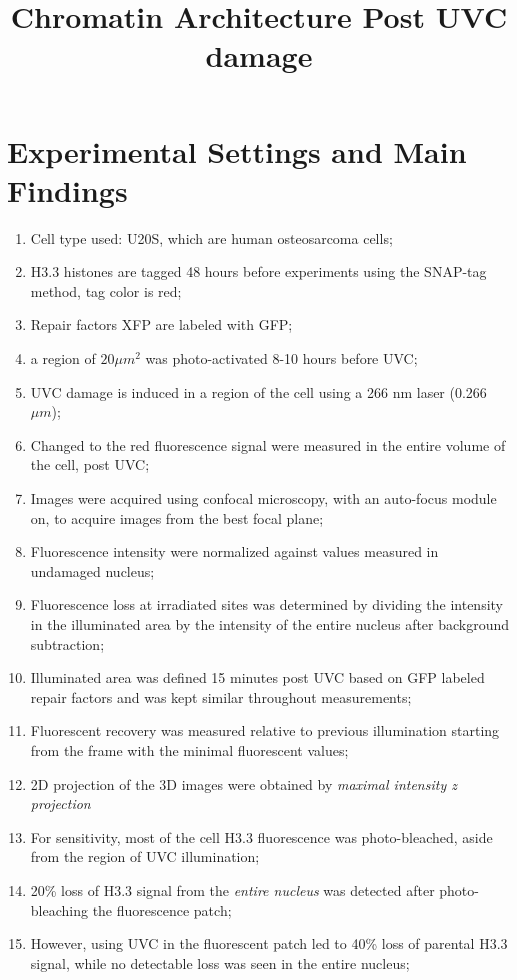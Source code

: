 \documentclass[12pt]{report}
\begin{document}
	
	\title{Chromatin Architecture Post UVC damage}
	\maketitle
	\section{Experimental Settings and Main Findings}
	\begin{enumerate}
		\item Cell type used: U20S, which are human osteosarcoma cells;
		\item H3.3 histones are tagged 48 hours before experiments using the SNAP-tag method, tag color is red;
		\item Repair factors XFP are labeled with GFP;
		\item a region of $20 \mu m^2$ was photo-activated 8-10 hours before UVC;
		\item UVC damage is induced in a region of the cell using a 266 nm laser (0.266 $\mu m$);
		\item Changed to the red fluorescence signal were measured in the entire volume of the cell, post UVC;
		\item Images were acquired using confocal microscopy, with an auto-focus module on, to acquire images from the best focal plane;
		\item Fluorescence intensity were normalized against values measured in undamaged nucleus;
		\item Fluorescence loss at irradiated sites was determined by dividing the intensity in the illuminated area by the intensity of the entire nucleus after background subtraction;
		\item Illuminated area was defined 15 minutes post UVC based on GFP labeled repair factors and was kept similar throughout measurements;
		\item Fluorescent recovery was measured relative to previous illumination starting from the frame with the minimal fluorescent values;
		\item 2D projection of the 3D images were obtained by \textit{maximal intensity z projection}
		\item For sensitivity, most of the cell H3.3 fluorescence was photo-bleached, aside from the region of UVC illumination;
		\item 20\% loss of H3.3 signal from the \textit{entire nucleus} was detected after photo-bleaching the fluorescence patch;
		\item However, using UVC in the fluorescent patch led to 40\% loss of parental H3.3 signal, while no detectable loss was seen in the entire nucleus;		

\end{enumerate}
\end{document}
